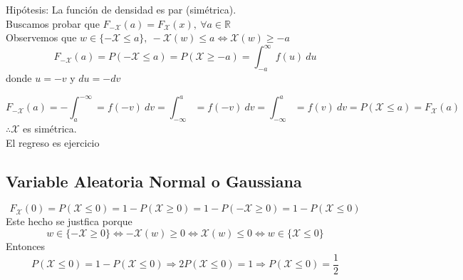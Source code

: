 
\begin{myproof}
  \boxed{\Leftarrow} Hipótesis: La función de densidad es par (simétrica). \\Buscamos probar que $F_{\mathcal {-X}}(a) = F_{\mathcal X}(x),~ \forall a \in \mathbb R$\\
  Observemos que $w \in \{-\mathcal X \le a\},~ -\mathcal X (w)\le a \Leftrightarrow \mathcal X(w) \ge -a$
  \[F_{-\mathcal X}(a) = P(-\mathcal X \le a) = P(\mathcal X \ge -a) = \int_{-a}^{\infty} f(u)~du\] donde $u = -v$ y $du = -dv$

  \[F_{-\mathcal X}(a) = - \int_{a}^{-\infty} = f(-v)~dv = \int_{-\infty}^a = f(-v)~dv = \int_{-\infty}^a = f(v)~dv = P(\mathcal X \le a) = F_{\mathcal X}(a)\]
  $\therefore \mathcal X$ es simétrica.\\
  El regreso es ejercicio

\end{myproof}

\subsection{Variable Aleatoria Normal o Gaussiana}





\begin{myproof}
  \[F_{\mathcal X}(0) = P(\mathcal X \le 0) = 1 - P(\mathcal X \ge 0) = 1 - P(-\mathcal X \ge 0) = 1 - P(\mathcal X \le 0)\]
  Este hecho se justfica porque
  \[w \in \{-\mathcal X  \ge 0\} \Leftrightarrow -\mathcal X(w) \ge 0 \Leftrightarrow \mathcal X(w) \le 0 \Leftrightarrow w \in \{\mathcal X \le 0\}\]
  Entonces
  \[P(\mathcal X \le 0) = 1 - P(\mathcal X \le 0) \Rightarrow 2P(\mathcal X \le 0)= 1 \Rightarrow P(\mathcal X \le 0) = \frac12\]
\end{myproof}

